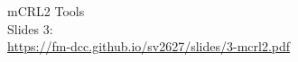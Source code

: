 \documentclass[aspectratio=169]{beamer}
\begin{document}

  


\begin{frame}
  \huge\centering
  mCRL2 Tools
  \\[5mm]\large
  Slides 3:\\\url{https://fm-dcc.github.io/sv2627/slides/3-mcrl2.pdf}
\end{frame}
\end{document}
